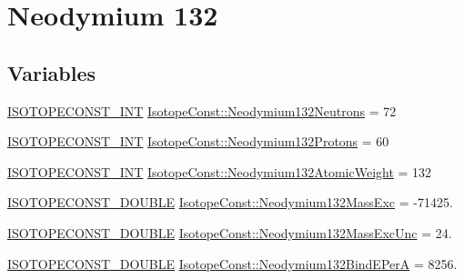 \hypertarget{group___isotope_const-_neodymium-_nd132}{}\section{Neodymium 132}
\label{group___isotope_const-_neodymium-_nd132}
\subsection*{Variables}
\begin{DoxyCompactItemize}
\item 
\mbox{\hyperlink{group___isotope_const-_macros_ga5f18360b3e99483a35c32d789e62621c}{I\+S\+O\+T\+O\+P\+E\+C\+O\+N\+S\+T\+\_\+\+I\+NT}} \mbox{\hyperlink{group___isotope_const-_neodymium-_nd132_gad2d39515febb77b75336fcb59b96bb16}{Isotope\+Const\+::\+Neodymium132\+Neutrons}} = 72
\item 
\mbox{\hyperlink{group___isotope_const-_macros_ga5f18360b3e99483a35c32d789e62621c}{I\+S\+O\+T\+O\+P\+E\+C\+O\+N\+S\+T\+\_\+\+I\+NT}} \mbox{\hyperlink{group___isotope_const-_neodymium-_nd132_ga29c8d828d88657f9331dd3d93006beef}{Isotope\+Const\+::\+Neodymium132\+Protons}} = 60
\item 
\mbox{\hyperlink{group___isotope_const-_macros_ga5f18360b3e99483a35c32d789e62621c}{I\+S\+O\+T\+O\+P\+E\+C\+O\+N\+S\+T\+\_\+\+I\+NT}} \mbox{\hyperlink{group___isotope_const-_neodymium-_nd132_ga2d6ca3d63b9e0194f2586f181ee27cfa}{Isotope\+Const\+::\+Neodymium132\+Atomic\+Weight}} = 132
\item 
\mbox{\hyperlink{group___isotope_const-_macros_ga8f45a7272ce02c0b4c65c44636ed719a}{I\+S\+O\+T\+O\+P\+E\+C\+O\+N\+S\+T\+\_\+\+D\+O\+U\+B\+LE}} \mbox{\hyperlink{group___isotope_const-_neodymium-_nd132_gab39c13c74c5a201062f4f89b1b75fefb}{Isotope\+Const\+::\+Neodymium132\+Mass\+Exc}} = -\/71425.
\item 
\mbox{\hyperlink{group___isotope_const-_macros_ga8f45a7272ce02c0b4c65c44636ed719a}{I\+S\+O\+T\+O\+P\+E\+C\+O\+N\+S\+T\+\_\+\+D\+O\+U\+B\+LE}} \mbox{\hyperlink{group___isotope_const-_neodymium-_nd132_gaecc8c893f89feee78ea8b481b2591867}{Isotope\+Const\+::\+Neodymium132\+Mass\+Exc\+Unc}} = 24.
\item 
\mbox{\hyperlink{group___isotope_const-_macros_ga8f45a7272ce02c0b4c65c44636ed719a}{I\+S\+O\+T\+O\+P\+E\+C\+O\+N\+S\+T\+\_\+\+D\+O\+U\+B\+LE}} \mbox{\hyperlink{group___isotope_const-_neodymium-_nd132_ga56a9e6ac16a8c8f5df2209aacb747441}{Isotope\+Const\+::\+Neodymium132\+Bind\+E\+PerA}} = 8256.
\item 

\end{DoxyCompactItemize}
